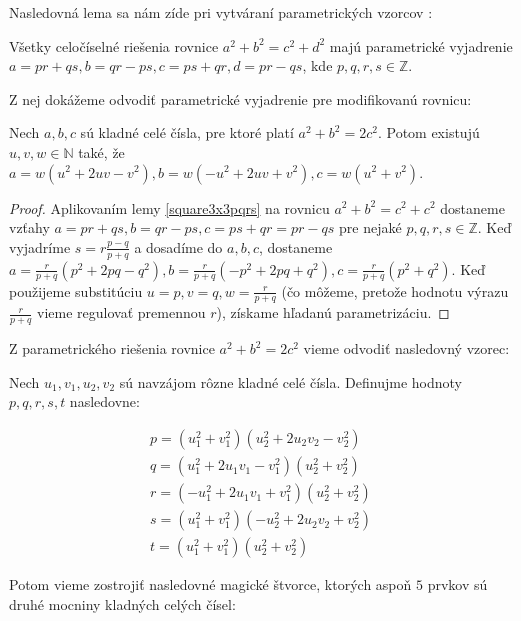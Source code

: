Nasledovná lema sa nám zíde pri vytváraní parametrických vzorcov \cite{algebraic}:

\begin{lemma}
\label{square3x3pqrs}
Všetky celočíselné riešenia rovnice $a^2 + b^2 = c^2 + d^2$ majú parametrické vyjadrenie $a = pr + qs, b = qr - ps, c = ps + qr, d = pr - qs$, kde $p,q,r,s \in \mathbb{Z}$.
\end{lemma}

Z nej dokážeme odvodiť parametrické vyjadrenie pre modifikovanú rovnicu:

\begin{lemma} 
\label{square3x3uvw}
Nech $a,b,c$ sú kladné celé čísla, pre ktoré platí $a^2 + b^2 = 2c^2$. Potom existujú $u,v,w \in \mathbb{N}$ také, že $a = w(u^2 + 2uv - v^2), b = w(- u^2 + 2uv + v^2), c = w(u^2 + v^2)$.
\end{lemma}

\begin{proof} 
Aplikovaním lemy \ref{square3x3pqrs} na rovnicu $a^2 + b^2 = c^2 + c^2$ dostaneme vzťahy $a = pr + qs, b = qr - ps, c = ps + qr = pr - qs$ pre nejaké $p,q,r,s \in \mathbb{Z}$. Keď vyjadríme $s = r \frac{p-q}{p+q}$ a dosadíme do $a,b,c$, dostaneme $a =  \frac{r}{p+q} (p^2 + 2pq - q^2), b = \frac{r}{p+q} (-p^2 + 2pq + q^2), c = \frac{r}{p+q} (p^2 + q^2)$. Keď použijeme substitúciu $u = p, v = q, w = \frac{r}{p+q}$ (čo môžeme, pretože hodnotu výrazu $\frac{r}{p+q}$ vieme regulovať premennou $r$), získame hľadanú parametrizáciu.
\end{proof}

Z parametrického riešenia rovnice $a^2 + b^2 = 2c^2$ vieme odvodiť nasledovný vzorec:

\begin{theorem}
\label{3x3square5squares}
Nech $u_1, v_1, u_2, v_2$ sú navzájom rôzne kladné celé čísla. Definujme hodnoty $p,q,r,s,t$ nasledovne:

\begin{gather*}
p = (u_1^2 + v_1^2)(u_2^2 + 2u_2 v_2 - v_2^2) \\
q = (u_1^2 + 2u_1 v_1 - v_1^2)(u_2^2 + v_2^2) \\
r = (- u_1^2 + 2u_1 v_1 + v_1^2)(u_2^2 + v_2^2) \\
s = (u_1^2 + v_1^2)(-u_2^2 + 2u_2 v_2 + v_2^2) \\
t = (u_1^2 + v_1^2)(u_2^2 + v_2^2)
\end{gather*}

Potom vieme zostrojiť nasledovné magické štvorce, ktorých aspoň $5$ prvkov sú druhé mocniny kladných celých čísel:
\end{theorem}

